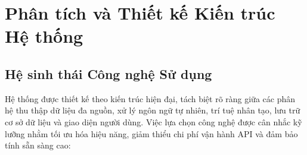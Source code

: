 \documentclass[12pt, a4paper]{article}
\begin{document}
\clearpage
\section{Phân tích và Thiết kế Kiến trúc Hệ thống}

\subsection{Hệ sinh thái Công nghệ Sử dụng}

Hệ thống được thiết kế theo kiến trúc hiện đại, tách biệt rõ ràng giữa các phân hệ thu thập dữ liệu đa nguồn, xử lý ngôn ngữ tự nhiên, trí tuệ nhân tạo, lưu trữ cơ sở dữ liệu và giao diện người dùng. Việc lựa chọn công nghệ được cân nhắc kỹ lưỡng nhằm tối ưu hóa hiệu năng, giảm thiểu chi phí vận hành API và đảm bảo tính sẵn sàng cao:
\end{document}
